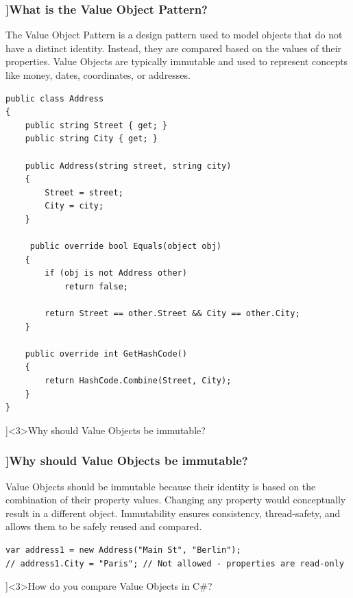 \begin{frame}[fragile]
  \frametitle{\AnswerTitle[\CategoryBadge[OOPColor!20]{Design Patterns}]{What is the Value Object Pattern?}}

  {\footnotesize
  The Value Object Pattern is a design pattern used to model objects that do not have a distinct identity. Instead, they are compared based on the values of their properties. Value Objects are typically immutable and used to represent concepts like money, dates, coordinates, or addresses.
  }

  \begin{verbatim}
public class Address
{
    public string Street { get; }
    public string City { get; }

    public Address(string street, string city)
    {
        Street = street;
        City = city;
    }
    
     public override bool Equals(object obj)
    {
        if (obj is not Address other)
            return false;

        return Street == other.Street && City == other.City;
    }

    public override int GetHashCode()
    {
        return HashCode.Combine(Street, City);
    }
}
  \end{verbatim}
\end{frame}

\QuestionSlide[\CategoryBadge[OOPColor!20]{Design Patterns}]<3>{Why should Value Objects be immutable?}

\begin{frame}[fragile]
  \frametitle{\AnswerTitle[\CategoryBadge[OOPColor!20]{Design Patterns}]{Why should Value Objects be immutable?}}

  {\footnotesize
  Value Objects should be immutable because their identity is based on the combination of their property values. Changing any property would conceptually result in a different object. Immutability ensures consistency, thread-safety, and allows them to be safely reused and compared.
  }

  \begin{verbatim}
var address1 = new Address("Main St", "Berlin");
// address1.City = "Paris"; // Not allowed - properties are read-only
  \end{verbatim}
\end{frame}

\QuestionSlide[\CategoryBadge[OOPColor!20]{Design Patterns}]<3>{How do you compare Value Objects in C\#?}

